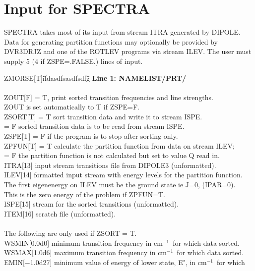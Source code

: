 \documentclass{elsart}
\def\cm{{cm$^{-1}$}}
\begin{document}
\section{Input for SPECTRA}

SPECTRA takes most of its input from stream ITRA generated by DIPOLE. Data for
generating partition functions may optionally be provided by DVR3DRJZ and one
of the ROTLEV programs via stream
ILEV. The user must supply 5 (4 if ZSPE=.FALSE.) lines of input.

\vskip 0.2cm
\begin{tabbing}
ZMORSE[T]i\=    fdasdfsasdfsdfg\=   \=             \kill
{\bf Line 1: NAMELIST/PRT/}\\
\\
ZOUT[F] \> = T, print sorted transition frequencies and line strengths. \\
\> ZOUT is set automatically to T if ZSPE=F.\\
ZSORT[T] \> = T sort transition data and write it to stream ISPE.\\
         \> = F sorted transition data is to be read from stream ISPE.\\
ZSPE[T] \> = F if the program is to stop after sorting only.\\
ZPFUN[T] \> = T calculate the partition function from data on stream
ILEV;\\
 \> = F the partition function is not calculated but set to value Q read
in.\\
ITRA[13] \>  input stream transitions file from DIPOLE3 (unformatted).\\
ILEV[14] \>  formatted input stream with energy levels for the
partition function.\\
\>The first eigenenergy on ILEV must be the ground state ie J=0, (IPAR=0).\\
\>This is the zero energy of the problem if ZPFUN=T.\\
ISPE[15] \>  stream for the sorted transitions (unformatted).\\
ITEM[16] \>  scratch file  (unformatted).\\
\\
The following are only used if ZSORT = T.
\\
WSMIN[0.0d0]  minimum transition frequency in \cm\ for which
data sorted.\\
WSMAX[1.0d6]  maximum transition frequency in \cm\ for which
data sorted.\\
EMIN[$-$1.0d27] minimum value of energy of lower state, E", in \cm\ for which

\end{tabbing}
\end{document}

